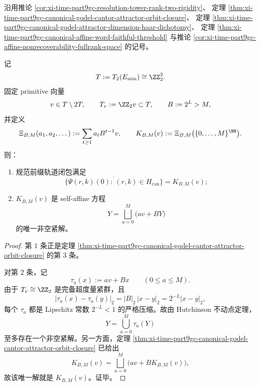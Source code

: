 \noindent
沿用推论 \ref{cor:xi-time-part9gc-resolution-tower-rank-two-rigidity}、
定理 \ref{thm:xi-time-part9gc-canonical-godel-cantor-attractor-orbit-closure}、
定理 \ref{thm:xi-time-part9gc-canonical-godel-attractor-dimension-haar-dichotomy}、
定理 \ref{thm:xi-time-part9gc-canonical-affine-word-faithful-threshold}
与推论 \ref{cor:xi-time-part9gc-affine-nonrecoverability-fullrank-space} 的记号。

\begin{theorem}\label{thm:conclusion-tate-rankone-canonical-chart-orbit-hutchinson-rigidity}
记
\[
T:=T_2(E_{\min})\cong \ZZ_2^2.
\]
固定 primitive 向量
\[
v\in T\setminus 2T,
\qquad
T_v:=\ZZ_2v\subset T,
\qquad
B:=2^L>M,
\]
并定义
\[
\Xi_{B,M}(a_1,a_2,\dots):=\sum_{t\ge 1}a_tB^{t-1}v,
\qquad
K_{B,M}(v):=\Xi_{B,M}\bigl(\{0,\dots,M\}^{\NN}\bigr).
\]
则：
\begin{enumerate}
  \item 规范前缀轨道闭包满足
  \[
  \overline{\{\Psi(r,k)(0):\ (r,k)\in H_{\mathrm{can}}\}}
  =
  K_{B,M}(v);
  \]
  \item \(K_{B,M}(v)\) 是 self-affine 方程
  \[
  Y=\bigsqcup_{a=0}^{M}\bigl(av+BY\bigr)
  \]
  的唯一非空紧解。
\end{enumerate}
\end{theorem}
\begin{proof}
第 \(1\) 条正是定理 \ref{thm:xi-time-part9gc-canonical-godel-cantor-attractor-orbit-closure} 的第 \(3\) 条。

对第 \(2\) 条，记
\[
\tau_a(x):=av+Bx
\qquad (0\le a\le M).
\]
由于 \(T_v\cong \ZZ_2\) 是完备超度量紧群，且
\[
|\tau_a(x)-\tau_a(y)|_2=|B|_2\,|x-y|_2=2^{-L}|x-y|_2,
\]
每个 \(\tau_a\) 都是 Lipschitz 常数 \(2^{-L}<1\) 的严格压缩。故由 Hutchinson 不动点定理，
\[
Y=\bigcup_{a=0}^{M}\tau_a(Y)
\]
至多存在一个非空紧解。另一方面，定理 \ref{thm:xi-time-part9gc-canonical-godel-cantor-attractor-orbit-closure} 已给出
\[
K_{B,M}(v)=\bigsqcup_{a=0}^{M}\bigl(av+BK_{B,M}(v)\bigr),
\]
故该唯一解就是 \(K_{B,M}(v)\)。证毕。
\end{proof}


